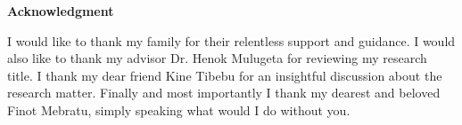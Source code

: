 \documentclass[../main/main.tex]{subfiles}
\begin{document}
	\begin{center}
	{ \bf Acknowledgment}
	\end{center}

	I would like to thank my family for their relentless support and guidance. I would also like to thank my advisor Dr. Henok Mulugeta for reviewing my research title.  I thank my dear friend Kine Tibebu for an insightful discussion about the research matter. Finally and most importantly I thank my dearest and beloved Finot Mebratu, simply speaking what would I do without you.
\end{document}
